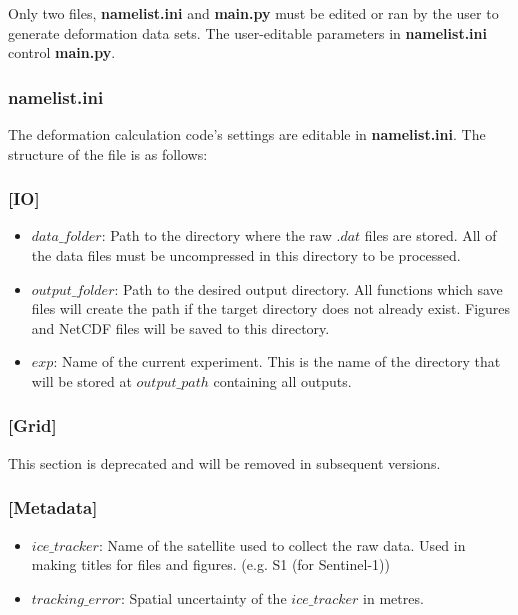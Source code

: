 \documentclass{article}
\begin{document}
        Only two files, \textbf{namelist.ini} and \textbf{main.py} must be edited or ran by the user to generate deformation data sets. The user-editable parameters in \textbf{namelist.ini} control \textbf{main.py}.

        \subsubsection*{\textbf{namelist.ini}}

            The deformation calculation code's settings are editable in \textbf{namelist.ini}. The structure of the file is as follows:

        \subsubsection*{[IO]}

            \begin{itemize}
                \item $data\_folder$: Path to the directory where the raw $.dat$ files are stored. All of the data files must be uncompressed in this directory to be processed.
                \item $output\_folder$: Path to the desired output directory. All functions which save files will create the path if the target directory does not already exist. Figures and NetCDF files will be saved to this directory.
                \item $exp$: Name of the current experiment. This is the name of the directory that will be stored at $output\_path$ containing all outputs.
            \end{itemize}

        \subsubsection*{[Grid]}

            This section is deprecated and will be removed in subsequent versions.

        \subsubsection*{[Metadata]}

            \begin{itemize}
                \item $ice\_tracker$: Name of the satellite used to collect the raw data. Used in making titles for files and figures. (e.g. S1 (for Sentinel-1))
                \item $tracking\_error$: Spatial uncertainty of the $ice\_tracker$ in metres.
            \end{itemize}
\end{document}
